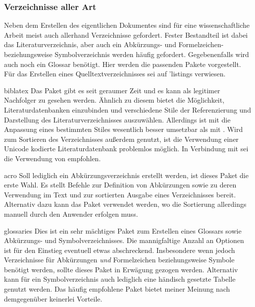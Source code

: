 \documentclass[%
  english,ngerman,%
  headings=optiontoheadandtoc,captions=tableheading,numbers=noenddot,%
  chapterpage,cdfoot,%
]{tudscrman}
\begin{document}
\subsubsection{Verzeichnisse aller Art}
Neben dem Erstellen des eigentlichen Dokumentes sind für eine wissenschaftliche 
Arbeit meist auch allerhand Verzeichnisse gefordert. Fester Bestandteil ist 
dabei das Literaturverzeichnis, aber auch ein Abkürzungs- und Formelzeichen- 
beziehungsweise Symbolverzeichnis werden häufig gefordert. Gegebenenfalls wird 
auch noch ein Glossar benötigt. Hier werden die passenden Pakete vorgestellt. 
Für das Erstellen eines Quelltextverzeichnisses sei auf \Package'{listings} 
verwiesen.
\begin{packages}
\item[biblatex]
  Das Paket gibt es seit geraumer Zeit und es kann als legitimer Nachfolger zu 
   gesehen werden. Ähnlich zu diesem bietet  
  die Möglichkeit, Literaturdatenbanken einzubinden und verschiedene Stile der 
  Referenzierung und Darstellung des Literaturverzeichnisses auszuwählen. 
  Allerdings ist mit  die Anpassung eines bestimmten Stiles 
  wesentlich besser umsetzbar als mit . Wird zum Sortieren des 
  Verzeichnisses außerdem  genutzt, ist die Verwendung 
  einer Unicode kodierte Literaturdatenbank problemlos möglich. In Verbindung 
  mit  sei die Verwendung von  empfohlen.
\item[acro]
  Soll lediglich ein Abkürzungsverzeichnis erstellt werden, ist dieses Paket die 
  erste Wahl. Es stellt Befehle zur Definition von Abkürzungen sowie zu deren 
  Verwendung im Text und zur sortierten Ausgabe eines Verzeichnisses bereit. 
  Alternativ dazu kann das Paket  verwendet werden, wo die 
  Sortierung allerdings manuell durch den Anwender erfolgen muss.
\item[glossaries]
  Dies ist ein sehr mächtiges Paket zum Erstellen eines Glossars sowie 
  Abkürzungs- und Symbolverzeichnisses. Die mannigfaltige Anzahl an Optionen ist 
  für den Einstieg eventuell etwas abschreckend. Insbesondere wenn jedoch 
  Verzeichnisse für Abkürzungen \emph{und} Formelzeichen beziehungsweise Symbole 
  benötigt werden, sollte dieses Paket in Erwägung gezogen werden. Alternativ 
  kann für ein Symbolverzeichnis auch lediglich eine händisch gesetzte Tabelle 
  genutzt werden. Das häufig empfohlene Paket  bietet meiner 
  Meinung nach demgegenüber keinerlei Vorteile.
\end{packages}
\end{document}
